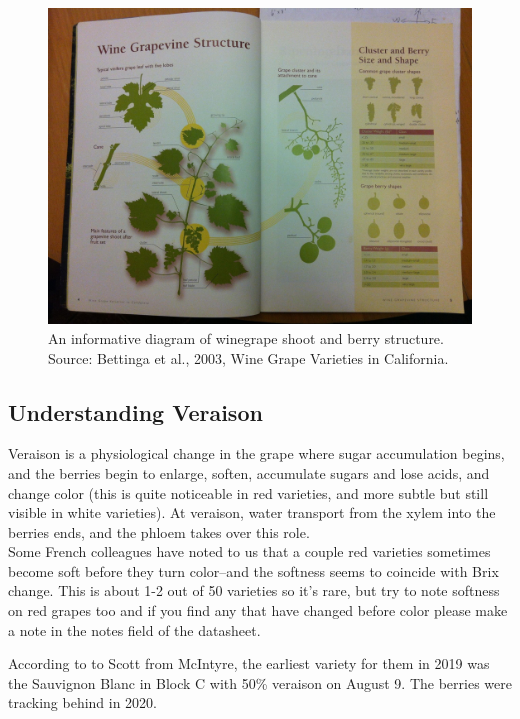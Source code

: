 \documentclass[11pt,letter]{article}
\begin{document}
\begin{enumerate}
\begin{figure}
  \includegraphics[width=\linewidth]{Bettiga2003Diagram.jpg}
  \caption{An informative diagram of winegrape shoot and berry structure. Source: Bettinga et al., 2003, Wine Grape Varieties in California. }
  \label{fig:Bettiga2003Diagram}
\end{figure}
	
\end{enumerate}

\subsection{Understanding Veraison}
Veraison is a physiological change in the grape where sugar accumulation begins, and the berries begin to enlarge, soften, accumulate sugars and lose acids, and change color (this is quite noticeable in red varieties, and more subtle but still visible in white varieties). At veraison, water transport from the xylem into the berries ends, and the phloem takes over this role.\\ 

Some French colleagues have noted to us that a couple red varieties sometimes become soft before they turn color--and the softness seems to coincide with Brix change. This is about 1-2 out of 50 varieties so it's rare, but try to note softness on red grapes too and if you find any that have changed before color please make a note in the notes field of the datasheet.

According to  to Scott from McIntyre, the earliest variety for them in 2019 was the Sauvignon Blanc in Block C with 50\% veraison on August 9. The berries were tracking behind in 2020.
\end{document}
